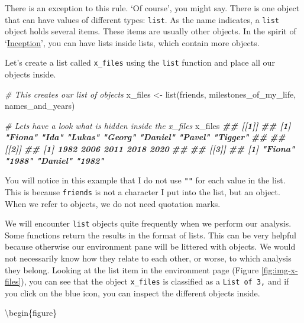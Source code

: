 \documentclass[
]{book}
\newenvironment{Shaded}{\begin{snugshade}}{\end{snugshade}}
\newcommand{\CommentTok}[1]{\textcolor[rgb]{0.56,0.35,0.01}{\textit{#1}}}
\newcommand{\DocumentationTok}[1]{\textcolor[rgb]{0.56,0.35,0.01}{\textbf{\textit{#1}}}}
\newcommand{\FunctionTok}[1]{\textcolor[rgb]{0.00,0.00,0.00}{#1}}
\newcommand{\NormalTok}[1]{#1}
\newcommand{\OtherTok}[1]{\textcolor[rgb]{0.56,0.35,0.01}{#1}}
\begin{document}
There is an exception to this rule. `Of course', you might say. There is one object that can have values of different types: \texttt{list}. As the name indicates, a \texttt{list} object holds several items. These items are usually other objects. In the spirit of `\href{https://www.imdb.com/title/tt1375666/?ref_=ext_shr_lnk}{Inception}', you can have lists inside lists, which contain more objects.

Let's create a list called \texttt{x\_files} using the \texttt{list} function and place all our objects inside.

\begin{Shaded}
\begin{Highlighting}[]
\CommentTok{\# This creates our list of objects}
\NormalTok{x\_files }\OtherTok{\textless{}{-}} \FunctionTok{list}\NormalTok{(friends,}
\NormalTok{               milestones\_of\_my\_life,}
\NormalTok{               names\_and\_years)}

\CommentTok{\# Let\textquotesingle{}s have a look what is hidden inside the x\_files}
\NormalTok{x\_files}
\DocumentationTok{\#\# [[1]]}
\DocumentationTok{\#\# [1] "Fiona"  "Ida"    "Lukas"  "Georg"  "Daniel" "Pavel"  "Tigger"}
\DocumentationTok{\#\# }
\DocumentationTok{\#\# [[2]]}
\DocumentationTok{\#\# [1] 1982 2006 2011 2018 2020}
\DocumentationTok{\#\# }
\DocumentationTok{\#\# [[3]]}
\DocumentationTok{\#\# [1] "Fiona"  "1988"   "Daniel" "1982"}
\end{Highlighting}
\end{Shaded}

You will notice in this example that I do not use \texttt{""} for each value in the list. This is because \texttt{friends} is not a character I put into the list, but an object. When we refer to objects, we do not need quotation marks.

We will encounter \texttt{list} objects quite frequently when we perform our analysis. Some functions return the results in the format of lists. This can be very helpful because otherwise our environment pane will be littered with objects. We would not necessarily know how they relate to each other, or worse, to which analysis they belong. Looking at the list item in the environment page (Figure \ref{fig:img-x-files}), you can see that the object \texttt{x\_files} is classified as a \texttt{List\ of\ 3,} and if you click on the blue icon, you can inspect the different objects inside.

\textbackslash begin\{figure\}
\end{document}
